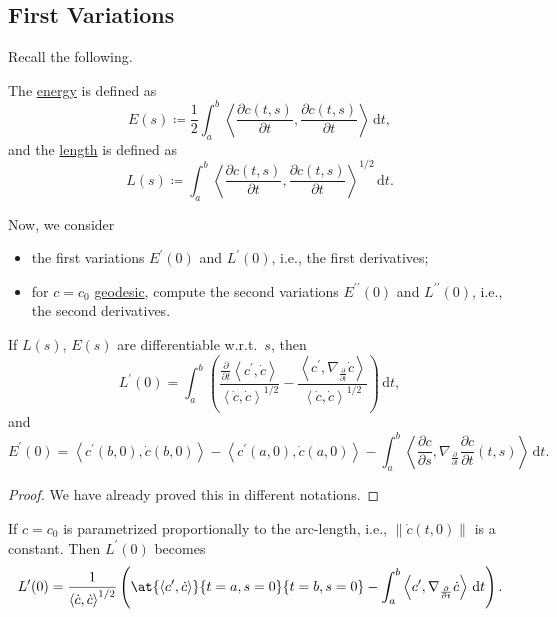 \subsection{First Variations}
Recall the following.

\begin{prev}
	The \hyperref[def:energy]{energy} is defined as
	\[
		E(s) \coloneqq \frac{1}{2} \int_{a}^{b} \left\langle \frac{\partial c(t, s)}{\partial t} , \frac{\partial c(t, s)}{\partial t}  \right\rangle  \,\mathrm{d}t,
	\]
	and the \hyperref[def:length]{length} is defined as
	\[
		L(s) \coloneqq \int_{a}^{b} \left\langle \frac{\partial c(t, s)}{\partial t} , \frac{\partial c(t, s)}{\partial t}  \right\rangle ^{1 / 2} \,\mathrm{d}t.
	\]
\end{prev}

Now, we consider
\begin{itemize}
	\item the first variations \(E^\prime (0) \) and \(L^\prime (0)\), i.e., the first derivatives;
	\item for \(c = c_0\) \hyperref[def:geodesic]{geodesic}, compute the second variations \(E^{\prime\prime}(0) \) and \(L^{\prime\prime}(0)\), i.e., the second derivatives.
\end{itemize}

\begin{lemma}
	If \(L(s)\), \(E(s)\) are differentiable w.r.t.\ \(s\), then
	\[
		L^\prime (0) = \int_{a}^{b} \left( \frac{\frac{\partial }{\partial t} \left\langle c^\prime , \dot{c}  \right\rangle }{\left\langle \dot{c} , \dot{c} \right\rangle ^{1 / 2}} - \frac{\left\langle c^\prime , \nabla _{\frac{\partial }{\partial t} } \dot{c} \right\rangle }{\left\langle \dot{c} , \dot{c} \right\rangle ^{1 / 2}}\right)  \,\mathrm{d}t,
	\]
	and
	\[
		E^\prime (0) = \left\langle c^\prime (b, 0), \dot{c} (b, 0) \right\rangle - \left\langle c^\prime (a, 0), \dot{c} (a, 0) \right\rangle - \int_{a}^{b} \left\langle \frac{\partial c}{\partial s} , \nabla _{\frac{\partial }{\partial t} }\frac{\partial c}{\partial t} (t, s) \right\rangle  \,\mathrm{d}t.
	\]
\end{lemma}
\begin{proof}
	We have already proved this in different notations.
\end{proof}

\begin{note}
	If \(c = c_0\) is parametrized proportionally to the arc-length, i.e., \(\lVert \dot{c} (t, 0) \rVert \) is a constant. Then \(L^\prime (0)\) becomes
	\[
		L^\prime (0) = \frac{1}{\left\langle \dot{c} , \dot{c}  \right\rangle ^{1 / 2}} \left( \at{\left\langle c^\prime , \dot{c} \right\rangle }{t=a, s=0}{t=b, s=0} - \int_{a}^{b} \left\langle c^\prime , \nabla _{\frac{\partial }{\partial t} }\dot{c}  \right\rangle  \,\mathrm{d}t \right).
	\]
\end{note}

